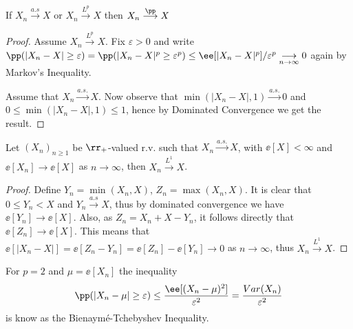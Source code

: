 \documentclass[../main.tex]{subfiles}
\begin{document}
   \begin{proposition}
       If $X_n \overset{a.s}{\longrightarrow} X$ or $X_n
       \overset{L^p}{\longrightarrow} X$ then $X_n
       \overset{\pp}{\longrightarrow} X$
   \end{proposition}
   \begin{proof}
       Assume $X_n \overset{L^p}{\longrightarrow} X$. Fix $\varepsilon>0$ and
       write $\pp(|X_n - X| \geq \varepsilon) = \pp(|X_n - X|^p \geq
       \varepsilon^p) \leq \ee[|X_n - X|^p] / \varepsilon^p \underset{n \to
       \infty}{\longrightarrow}0$ again by Markov's Inequality.

       \vspace{1em}
       \noindent
       Assume that $X_n \overset{a.s.}{\longrightarrow} X$. Now observe that
       $\min(|X_n - X|, 1) \overset{a.s.}{\longrightarrow} 0$ and $0 \leq
       \min(|X_n - X|, 1) \leq 1$, hence by Dominated Convergence we get the
       result.
   \end{proof}
   \begin{lemma}
     Let $(X_n)_{n \geq 1}$ be $\rr_+$-valued r.v. such that
     $X_n \overset{a.s.}{\longrightarrow}X$, with $\ee[X] < \infty$ and
     $\ee[X_n] \longrightarrow \ee[X]$ as $n \to \infty$, then $X_n
     \overset{L^1}{\longrightarrow} X$.
   \end{lemma}
   \begin{proof}
     Define $Y_n = \min(X_n, X)$, $Z_n = \max(X_n, X)$. It is clear that $0
     \leq Y_n < X$ and $Y_n \overset{a.s}{\longrightarrow} X$, thus by
     dominated convergence we have $\ee[Y_n] \to \ee[X]$. Also, as $Z_n = X_n
     + X - Y_n$, it follows directly that $\ee[Z_n] \to \ee[X]$. This means
     that $\ee[|X_n - X|] = \ee[Z_n - Y_n] = \ee[Z_n] - \ee[Y_n] \to 0$ as $n
     \to \infty$, thus $X_n \overset{L^1}{\longrightarrow}X$.
   \end{proof}
   \begin{remark}
     For $p = 2$ and $\mu = \ee[X_n]$
     the inequality
       \[
         \pp(|X_n - \mu| \geq \varepsilon) \leq \frac{\ee[(X_n -
        \mu)^2]}{\varepsilon^2} = \frac{Var(X_n)}{\varepsilon^2}
       \]
       is know as the Bienaymé-Tchebyshev Inequality.
   \end{remark}
\end{document}
